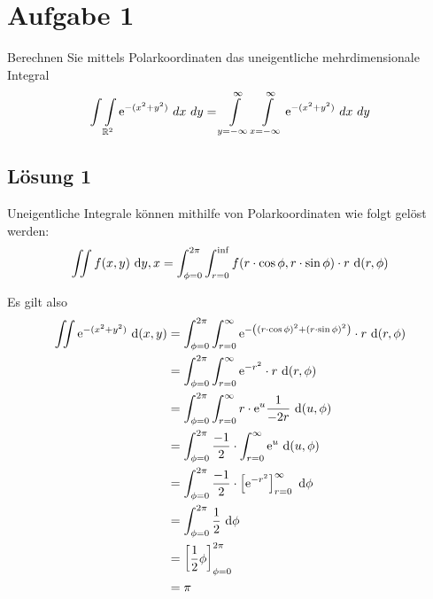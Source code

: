 \documentclass[main.tex]{subfiles}
\begin{document}
\section{Aufgabe 1}
Berechnen Sie mittels Polarkoordinaten das uneigentliche mehrdimensionale Integral
\[
\int \int \limits_{\mathbb{R}^2} \mathrm{e}^{-(x^2 + y^2)} \ dx \ dy
= \int \limits_{y = -\infty}^{\infty} \int \limits_{x=-\infty}^{\infty} 
		\mathrm{e}^{-(x^2 + y^2)} \ dx \ dy
\]

\subsection{Lösung 1}

Uneigentliche Integrale können mithilfe von Polarkoordinaten wie folgt gelöst werden:
\begin{align*}
    \iint f(x,y) ~\mathrm{d}y,x = \int_{\phi=0}^{2\pi} \int_{r=0}^{\inf} f(r\cdot \cos \phi, r\cdot \sin \phi) \cdot r ~\mathrm{d}(r,\phi) \\
\end{align*} 

Es gilt also
\begin{align*}
    \iint \mathrm{e}^{-(x^2 + y^2)} ~\mathrm{d}(x,y)
    &= \int_{\phi=0}^{2\pi} \int_{r=0}^{\infty} \mathrm{e}^{-\left((r\cdot \cos \phi)^2 + (r\cdot \sin \phi)^2\right)} \cdot r ~\mathrm{d}(r,\phi) \\
    &= \int_{\phi=0}^{2\pi} \int_{r=0}^{\infty} \mathrm{e}^{-r^2} \cdot r ~\mathrm{d}(r,\phi) \\
    &= \int_{\phi=0}^{2\pi} \int_{r=0}^{\infty} r\cdot \mathrm{e}^{u} \frac{1}{-2r} ~\mathrm{d}(u,\phi) \\
    &= \int_{\phi=0}^{2\pi} \frac{-1}{2} \cdot \int_{r=0}^{\infty} \mathrm{e}^{u} ~\mathrm{d}(u,\phi) \\
    &= \int_{\phi=0}^{2\pi} \frac{-1}{2} \cdot \left[ \mathrm{e}^{-r^2} \right]_{r=0}^{\infty} ~\mathrm{d}\phi \\
    &= \int_{\phi=0}^{2\pi} \frac{1}{2} ~\mathrm{d}\phi \\
    &= \left[ \frac{1}{2}\phi \right]_{\phi=0}^{2\pi} \\
    &= \pi \\
\end{align*}
\end{document}

